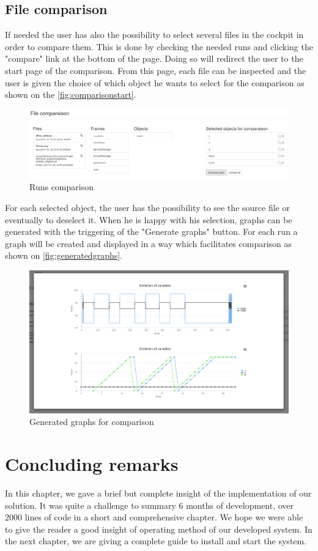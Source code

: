 \subsection{File comparison}
If needed the user has also the possibility to select several files in the cockpit in order to compare them. This is done by checking the needed runs and clicking the "compare" link at the bottom of the page. Doing so will redirect the user to the start page of the comparison. From this page, each file can be inspected and the user is given the choice of which object he wants to select for the comparison as shown on the \autoref{fig:comparisonstart}.
\begin{figure}[h!]
  \centering
    \includegraphics[width=\textwidth]{figures/yoda-comparison.png}
    \caption{Runs comparison}
    \label{fig:comparisonstart}
\end{figure}

For each selected object, the user has the possibility to see the source file or eventually to deselect it. When he is happy with his selection, graphs can be generated with the triggering of the "Generate graphs" button. For each run a graph will be created and displayed in a way which facilitates comparison as shown on \autoref{fig:generatedgraphs}.
\begin{figure}[h!]
  \centering
    \includegraphics[width=\textwidth]{figures/yoda-graphs.png}
    \caption{Generated graphs for comparison}
    \label{fig:generatedgraphs}
\end{figure}

\section{Concluding remarks}
In this chapter, we gave a brief but complete insight of the implementation of our solution. It was quite a challenge to summary 6 months of development, over 2000 lines of code in a short and comprehensive chapter. We hope we were able to give the reader a good insight of operating method of our developed system. In the next chapter, we are giving a complete guide to install and start the system.
